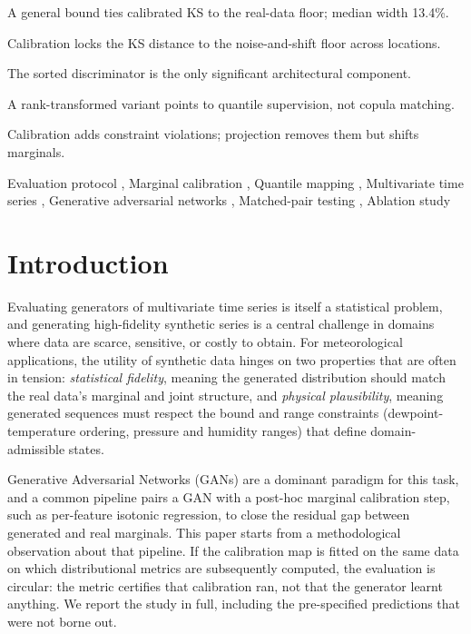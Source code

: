 \documentclass[preprint,12pt]{elsarticle}
\begin{document}
\begin{frontmatter}
\begin{highlights}
\item A general bound ties calibrated KS to the real-data floor; median
      width 13.4\%.
\item Calibration locks the KS distance to the noise-and-shift floor
      across \nLocsProtoWord{} locations.
\item The sorted discriminator is the only significant architectural
      component.
\item A rank-transformed variant points to quantile supervision, not
      copula matching.
\item Calibration adds constraint violations; projection removes them
      but shifts marginals.
\end{highlights}

\begin{keyword}
Evaluation protocol \sep
Marginal calibration \sep
Quantile mapping \sep
Multivariate time series \sep
Generative adversarial networks \sep
Matched-pair testing \sep
Ablation study
\end{keyword}

\end{frontmatter}


\section{Introduction}
\label{sec:intro}

Evaluating generators of multivariate time series is itself a
statistical problem, and generating high-fidelity synthetic series is a
central challenge in domains where data are scarce, sensitive, or costly
to obtain.  For meteorological applications, the utility of synthetic data
hinges on two properties that are often in tension: \textit{statistical
fidelity}, meaning the generated distribution should match the real
data's marginal and joint structure, and \textit{physical plausibility},
meaning generated sequences must respect the bound and range constraints
(dewpoint-temperature ordering, pressure and humidity ranges) that define
domain-admissible states.

Generative Adversarial Networks (GANs) \cite{goodfellow2014gan} are a
dominant paradigm for this task, and a common pipeline pairs a GAN with a
post-hoc marginal calibration step, such as per-feature isotonic
regression, to close the residual gap between generated and real
marginals.  This paper starts from a methodological observation about
that pipeline.  If the calibration map is fitted on the same data on
which distributional metrics are subsequently computed, the evaluation is
circular: the metric certifies that calibration ran, not that the
generator learnt anything.  We report the study in full, including
the pre-specified predictions that were not borne out.
\end{document}
